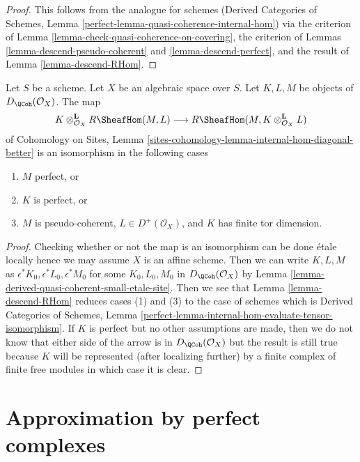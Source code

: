 \begin{proof}
This follows from the analogue for schemes
(Derived Categories of Schemes, Lemma
\ref{perfect-lemma-quasi-coherence-internal-hom})
via the criterion of Lemma \ref{lemma-check-quasi-coherence-on-covering},
the criterion of Lemmas \ref{lemma-descend-pseudo-coherent} and
\ref{lemma-descend-perfect},
and the result of Lemma \ref{lemma-descend-RHom}.
\end{proof}

\begin{lemma}
\label{lemma-internal-hom-evaluate-tensor-isomorphism}
Let $S$ be a scheme.
Let $X$ be an algebraic space over $S$.
Let $K, L, M$ be objects of $D_\QCoh(\mathcal{O}_X)$.
The map
$$
K \otimes_{\mathcal{O}_X}^\mathbf{L} R\SheafHom(M, L)
\longrightarrow
R\SheafHom(M, K \otimes_{\mathcal{O}_X}^\mathbf{L} L)
$$
of Cohomology on Sites, Lemma
\ref{sites-cohomology-lemma-internal-hom-diagonal-better}
is an isomorphism in the following cases
\begin{enumerate}
\item $M$ perfect, or
\item $K$ is perfect, or
\item $M$ is pseudo-coherent, $L \in D^+(\mathcal{O}_X)$, and $K$ has finite
tor dimension.
\end{enumerate}
\end{lemma}

\begin{proof}
Checking whether or not the map is an isomorphism can be done
\'etale locally hence we may assume $X$ is an affine scheme.
Then we can write $K, L, M$ as $\epsilon^*K_0, \epsilon^*L_0, \epsilon^*M_0$
for some $K_0, L_0, M_0$ in $D_\QCoh(\mathcal{O}_X)$ by
Lemma \ref{lemma-derived-quasi-coherent-small-etale-site}.
Then we see that Lemma \ref{lemma-descend-RHom}
reduces cases (1) and (3) to the case of schemes which
is Derived Categories of Schemes, Lemma
\ref{perfect-lemma-internal-hom-evaluate-tensor-isomorphism}.
If $K$ is perfect but no other assumptions are made, then we
do not know that either side of the arrow is in $D_\QCoh(\mathcal{O}_X)$
but the result is still true because $K$ will be represented
(after localizing further) by a finite complex of finite free modules
in which case it is clear.
\end{proof}









\section{Approximation by perfect complexes}
\label{section-approximation}

